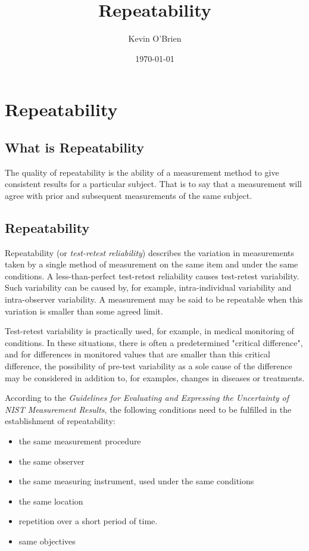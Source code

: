 \documentclass[12pt, a4paper]{article}
\begin{document}
	\author{Kevin O'Brien}
	\title{Repeatability}
	\date{\today}
	\maketitle
\tableofcontents
\newpage
\section{Repeatability}
\subsection{What is Repeatability}
The quality of repeatability is the ability of a measurement method to give consistent results for a particular subject. That is to say that a measurement will agree with prior and subsequent measurements of the same subject.

\subsection{Repeatability}
Repeatability (or \textit{test-retest reliability})  describes the variation in measurements taken by a single method of measurement on the same item and under the same conditions. 
A less-than-perfect test-retest reliability causes test-retest variability. Such variability can be caused by, for example, intra-individual variability and intra-observer variability. 
A measurement may be said to be repeatable when this variation is smaller than some agreed limit.

Test-retest variability is practically used, for example, in medical monitoring of conditions. In these situations, there is often a predetermined "critical difference", and for differences in monitored values that are smaller than this critical difference, the possibility of pre-test variability as a sole cause of the difference may be considered in addition to, for examples, changes in diseases or treatments.

According to the \textit{Guidelines for Evaluating and Expressing the Uncertainty of NIST Measurement Results}, the following conditions need to be fulfilled in the establishment of repeatability:
\begin{itemize}
	\item	the same measurement procedure
	\item	the same observer
	\item	the same measuring instrument, used under the same conditions
	\item	the same location
	\item	repetition over a short period of time.
	\item  same objectives
\end{itemize}
\bigskip
\end{document}
